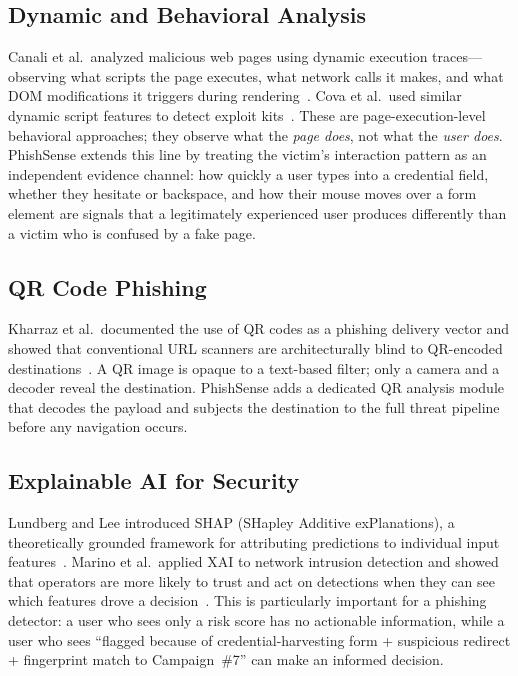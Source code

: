 \documentclass[conference]{IEEEtran}
\begin{document}
\subsection{Dynamic and Behavioral Analysis}
Canali et al.\ analyzed malicious web pages using dynamic execution traces---observing what scripts
the page executes, what network calls it makes, and what DOM modifications it triggers
during rendering~\cite{ref12}.
Cova et al.\ used similar dynamic script features to detect exploit kits~\cite{ref13}.
These are page-execution-level behavioral approaches; they observe what the \textit{page does},
not what the \textit{user does}.
PhishSense extends this line by treating the victim's interaction pattern as an independent
evidence channel: how quickly a user types into a credential field, whether they hesitate or
backspace, and how their mouse moves over a form element are signals that a legitimately
experienced user produces differently than a victim who is confused by a fake page.

\subsection{QR Code Phishing}
Kharraz et al.\ documented the use of QR codes as a phishing delivery vector and showed that
conventional URL scanners are architecturally blind to QR-encoded destinations~\cite{ref10}.
A QR image is opaque to a text-based filter; only a camera and a decoder reveal the destination.
PhishSense adds a dedicated QR analysis module that decodes the payload and subjects the
destination to the full threat pipeline before any navigation occurs.

\subsection{Explainable AI for Security}
Lundberg and Lee introduced SHAP (SHapley Additive exPlanations), a theoretically grounded
framework for attributing predictions to individual input features~\cite{ref15}.
Marino et al.\ applied XAI to network intrusion detection and showed that operators are more
likely to trust and act on detections when they can see which features drove a decision~\cite{ref16}.
This is particularly important for a phishing detector: a user who sees only a risk score has
no actionable information, while a user who sees ``flagged because of credential-harvesting form
+ suspicious redirect + fingerprint match to Campaign~\#7'' can make an informed decision.
\end{document}
